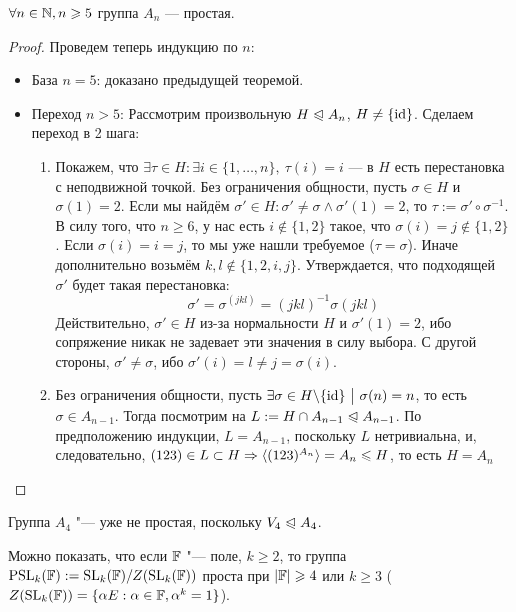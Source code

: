 \begin{theorem}
	$\forall n \in \mathbb{N}, n \geqslant 5$ группа $A_n$ --- простая.
\end{theorem}

\begin{proof}
	Проведем теперь индукцию по $n$:
	\begin{itemize}
		\item База $n = 5$: доказано предыдущей теоремой.
		
		\item Переход $n > 5$: Рассмотрим произвольную $H \trianglelefteqslant A_n$, $H \neq \{\operatorname{id}\}$. Сделаем переход в 2 шага:
		\begin{enumerate}
			\item Покажем, что $\exists \tau \in H \colon \exists i \in \{1, \ldots, n\},\ \tau(i) = i$ --- в $H$ есть перестановка с неподвижной точкой. Без ограничения общности, пусть $\sigma \in H$ и $\sigma(1) = 2$. Если мы найдём $\sigma' \in H \colon \sigma' \neq \sigma \wedge \sigma'(1) = 2$, то $\tau := \sigma' \circ \sigma^{-1}$. В силу того, что $n \ge 6$, у нас есть $i \notin \{1, 2\}$ такое, что $\sigma(i) = j \notin \{1, 2\}$. Если $\sigma(i) = i = j$, то мы уже нашли требуемое ($\tau = \sigma$). Иначе дополнительно возьмём $k, l \notin \{1, 2, i, j\}$. Утверждается, что подходящей $\sigma'$ будет такая перестановка:
			\[
				\sigma' = \sigma^{(jkl)} = (jkl)^{-1} \sigma (jkl)
			\]
			Действительно, $\sigma' \in H$ из-за нормальности $H$ и $\sigma'(1) = 2$, ибо сопряжение никак не задевает эти значения в силу выбора. С другой стороны, $\sigma' \neq \sigma$, ибо $\sigma'(i) = l \neq j = \sigma(i)$.
			
			\item Без ограничения общности, пусть $\exists \sigma \in H \backslash \{\operatorname{id}\} \ \big|\  \sigma(n) = n$, то есть $\sigma \in A_{n - 1}$. Тогда посмотрим на $L := H \cap A_{n - 1} \trianglelefteqslant A_{n - 1}$. По предположению индукции, $L = A_{n - 1}$, поскольку $L$ нетривиальна, и, следовательно, $(123) \in L \subset H \Rightarrow \langle(123)^{A_n}\rangle = A_n \leqslant H$, то есть $H = A_n$
		\end{enumerate}
	\end{itemize}
\end{proof}

\begin{note}
	Группа $A_4$ "--- уже не простая, поскольку $V_4 \trianglelefteqslant A_4$.
\end{note}

\begin{note}
	Можно показать, что если $\mathbb{F}$ "--- поле, $k \ge 2$, то группа $\operatorname{PSL}_k(\mathbb{F}) := \operatorname{SL}_k(\mathbb{F}) / Z(\operatorname{SL}_k(\mathbb{F}))$ проста при $|\mathbb{F}| \geqslant 4$ или $k \ge 3$ ($Z(\operatorname{SL}_k(\mathbb{F})) = \{\alpha E: \alpha \in \mathbb{F}, \alpha^k = 1\}$).
\end{note}

